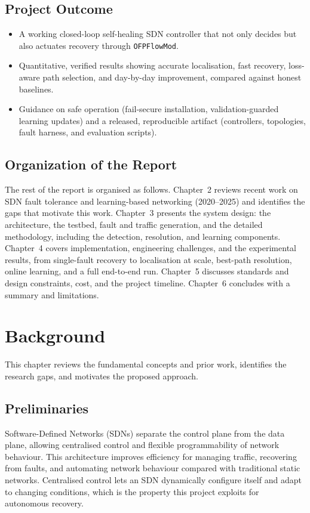 \documentclass[12pt,a4paper]{report}
\begin{document}
\section{Project Outcome}
\begin{itemize}
\item A working closed-loop self-healing SDN controller that not only decides but also
actuates recovery through \texttt{OFPFlowMod}.
\item Quantitative, verified results showing accurate localisation, fast recovery,
loss-aware path selection, and day-by-day improvement, compared against honest baselines.
\item Guidance on safe operation (fail-secure installation, validation-guarded learning
updates) and a released, reproducible artifact (controllers, topologies, fault harness, and
evaluation scripts).
\end{itemize}

\section{Organization of the Report}
The rest of the report is organised as follows. Chapter~2 reviews recent work on SDN fault
tolerance and learning-based networking (2020--2025) and identifies the gaps that motivate
this work. Chapter~3 presents the system design: the architecture, the testbed, fault and
traffic generation, and the detailed methodology, including the detection, resolution, and
learning components. Chapter~4 covers implementation, engineering challenges, and the
experimental results, from single-fault recovery to localisation at scale, best-path
resolution, online learning, and a full end-to-end run. Chapter~5 discusses standards and
design constraints, cost, and the project timeline. Chapter~6 concludes with a summary and
limitations.

\chapter{Background}
This chapter reviews the fundamental concepts and prior work, identifies the research gaps,
and motivates the proposed approach.

\section{Preliminaries}
Software-Defined Networks (SDNs) separate the control plane from the data plane, allowing
centralised control and flexible programmability of network behaviour. This architecture
improves efficiency for managing traffic, recovering from faults, and automating network
behaviour compared with traditional static networks. Centralised control lets an SDN
dynamically configure itself and adapt to changing conditions, which is the property this
project exploits for autonomous recovery.
\end{document}
